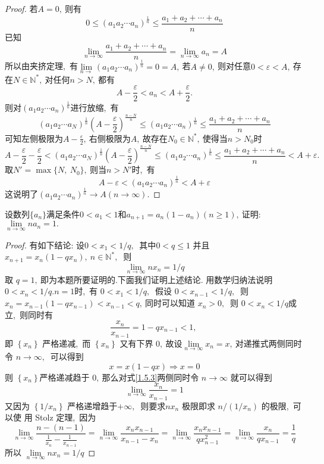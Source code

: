 \begin{proof}
	若$A=0,\ $则有
	$$0\leqslant(a_1a_2\cdots a_n)^{\frac{1}{n}}\leqslant\frac{a_1+a_2+\cdots+a_n}{n}$$
	已知
	$$\lim_{n\rightarrow\infty}\frac{a_1+a_2+\cdots+a_n}{n}=\lim_{n\rightarrow\infty}a_n=A$$
	所以由夹挤定理,\ 有$\lim\limits_{n\rightarrow}(a_1a_2\cdots a_n)^{\frac{1}{n}}=0=A,\ $若$A\neq 0,\ $则对任意$0<\varepsilon<A,\ $存在$N\in\mathbb N^*,\ $对任何$n>N,\ $都有
	$$A-\frac{\varepsilon}{2}<a_n<A+\frac{\varepsilon}{2}.$$
	则对$(a_1a_2\cdots a_n)^{\frac{1}{n}}$进行放缩,\ 有
	$$(a_1a_2\cdots a_N)^{\frac{1}{n}}\left(A-\frac{\varepsilon}{2}\right)^{\frac{n-N}{n}}\leqslant(a_1a_2\cdots a_n)^{\frac{1}{n}}\leqslant\frac{a_1+a_2+\cdots+a_n}{n}$$
	可知左侧极限为$A-\frac{\varepsilon}{2},\ $右侧极限为$A,\ $故存在$N_0\in\mathbb N^*,\ $使得当$n>N_0$时
	$$A-\frac{\varepsilon}{2}-\frac{\varepsilon}{2}<(a_1a_2\cdots a_N)^{\frac{1}{n}}\left(A-\frac{\varepsilon}{2}\right)^{\frac{n-N}{n}}\leqslant(a_1a_2\cdots a_n)^{\frac{1}{n}}\leqslant\frac{a_1+a_2+\cdots+a_n}{n}<A+\varepsilon.$$
	取$N'=\max\{N,\ N_0\},\ $则当$n>N'$时,\ 有
	$$A-\varepsilon<(a_1a_2\cdots a_n)^{\frac{1}{n}}<A+\varepsilon$$
	这说明了$(a_1a_2\cdots a_n)^{\frac{1}{n}}\rightarrow A(n\rightarrow\infty).$
\end{proof}
\newpage
\begin{problem}
	设数列$\{a_n\}$满足条件$0<a_1<1$和$a_{n+1}=a_n(1-a_n)(n\geqslant 1),\ $证明:$\lim\limits_{n\rightarrow\infty}na_n=1.$
\end{problem}
\begin{proof}
	有如下结论: $设  0<x_{1}<1 / q ,\ $ 其中$  0<q \leqslant 1$  并且 $ x_{n+1}=x_{n}\left(1-q x_{n}\right),\  n \in \mathbb{N}^{*} ,\ $ 则
	$$\lim\limits_{n \rightarrow \infty} n x_{n}=1 / q$$
	取  $q=1 ,\  $即为本题所要证明的.下面我们证明上述结论.
	用数学归纳法说明$  0<x_{n}<1 / q . n=1  $时,\  有 $ 0<x_{1}<1 / q ,\ $ 假设  $0<x_{n-1}<1 / q ,\ $ 则  $x_{n}=x_{n-1}\left(1-q x_{n-1}\right)<x_{n-1}<q ,\  $同时可以知道 $ x_{n}>0 ,\ $ 则 $ 0<x_{n}<1 / q  $成 立,\  则同时有
	\begin{equation}
		\frac{x_{n}}{x_{n-1}}=1-q x_{n-1}<1,\ \label{1.5.3}
	\end{equation}
	即 $ \left\{x_{n}\right\}$  严格递减,\  而 $ \left\{x_{n}\right\} $ 又有下界 $0 ,\  $故设$  \lim\limits_{n \rightarrow \infty} x_{n}=x ,\  $对递推式两侧同时令 $ n \rightarrow \infty ,\ $ 可以得到
	$$x=x(1-q x) \Rightarrow x=0$$
	则  $\left\{x_{n}\right\}  $严格递减趋于 $0 ,\  $那么对式\eqref{1.5.3}两侧同时令  $n \rightarrow \infty $ 就可以得到
	$$\lim\limits_{n \rightarrow \infty} \frac{x_{n}}{x_{n-1}}=1$$
	又因为 $ \left\{1 / x_{n}\right\} $ 严格递增趋于$  +\infty ,\ $ 则要求$  n x_{n}$  极限即求 $ n /\left(1 / x_{n}\right)$  的极限,\  可以使 用 Stolz 定理,\  因为
	$$\lim\limits_{n \rightarrow \infty} \frac{n-(n-1)}{\frac{1}{x_{n}}-\frac{1}{x_{n-1}}}=\lim\limits_{n \rightarrow \infty} \frac{x_{n} x_{n-1}}{x_{n-1}-x_{n}}=\lim\limits_{n \rightarrow \infty} \frac{x_{n} x_{n-1}}{q x_{n-1}^{2}}=\lim\limits_{n \rightarrow \infty} \frac{x_{n}}{q x_{n-1}}=\frac{1}{q}$$
	所以  $\lim\limits_{n \rightarrow \infty} n x_{n}=1 / q $
\end{proof}
